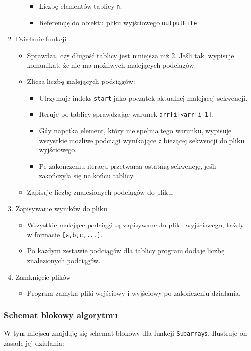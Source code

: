 \documentclass[a4paper,12pt]{article}
\begin{document}
\begin{enumerate}
\begin{itemize}
\begin{itemize}
\item[\textbullet]{Liczbę elementów tablicy \texttt{n}.}
\item[\textbullet]{Referencję do obiektu pliku wyjściowego \texttt{outputFile}}
\end{itemize}
\end{itemize}
\item{Działanie funkcji}
\begin{itemize}
\item{Sprawdza, czy długość tablicy jest mniejsza niż 2. Jeśli tak, wypisuje komunikat, że nie ma możliwych malejących podciągów.}
\item{Zlicza liczbę malejących podciągów:}
\begin{itemize}
\item[\textbullet]{Utrzymuje indeks \texttt{start} jako początek aktualnej malejącej sekwencji.}
\item[\textbullet]{Iteruje po tablicy sprawdzając warunek \texttt{arr[i]<arr[i-1]}.}
\item[\textbullet]{Gdy napotka element, który nie spełnia tego warunku, wypisuje wszystkie możliwe podciągi wynikające z bieżącej sekwencji do pliku wyjściowego.}
\item[\textbullet]{Po zakończeniu iteracji przetwarza ostatnią sekwencję, jeśli zakończyła się na końcu tablicy.}
\end{itemize}
\item{Zapisuje liczbę znalezionych podciągów do pliku.}
\end{itemize}
\item{Zapisywanie wyników do pliku}
\begin{itemize}
\item{Wszystkie malejące podciągi są zapisywane do pliku wyjściowego, każdy w formacie \texttt{[a,b,c,...]}.}
\item{Po każdym zestawie podciągów dla tablicy program dodaje liczbę znalezionych podciągów.}
\end{itemize}
\item{Zamknięcie plików}
\begin{itemize}
\item{Program zamyka pliki wejściowy i wyjściowy po zakończeniu działania.}
\end{itemize}
\end{enumerate}

\newpage

\subsubsection{Schemat blokowy algorytmu}
W tym miejscu znajduję się schemat blokowy dla funkcji \texttt{Subarrays}. Ilustruje on zasadę jej działania:
\end{document}
